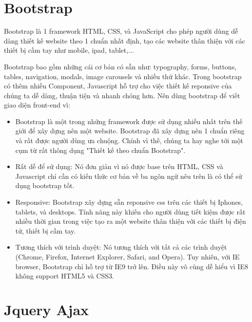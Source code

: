 \section{Bootstrap}
Bootstrap là 1 framework HTML, CSS, và JavaScript cho phép người dùng dễ dàng thiết kế website theo 1 chuẩn nhất định, tạo các website thân thiện với các thiết bị cầm tay như mobile, ipad, tablet,...
\par
Bootstrap bao gồm những cái cơ bản có sẵn như: typography, forms, buttons, tables, navigation, modals, image carousels và nhiều thứ khác. Trong bootstrap có thêm nhiều Component, Javascript hỗ trợ cho việc thiết kế reponsive của chúng ta dễ dàng, thuận tiện và nhanh chóng hơn. Nên dùng bootstrap để viết giao diện front-end vì:
\begin{itemize}
\item Bootstrap là một trong những framework được sử dụng nhiều nhất trên thế giới để xây dựng nên một website. Bootstrap đã xây dựng nên 1 chuẩn riêng và rất được người dùng ưa chuộng. Chính vì thế, chúng ta hay nghe tới một cụm từ rất thông dụng "Thiết kế theo chuẩn Bootstrap".
\item Rất dễ để sử dụng: Nó đơn giản vì nó được base trên HTML, CSS và Javascript chỉ cần có kiến thức cơ bản về ba ngôn ngữ nêu trên là có thể sử dụng bootstrap tốt.
\item Responsive: Bootstrap xây dựng sẵn reponsive css trên các thiết bị Iphones, tablets, và desktops. Tính năng này khiến cho người dùng tiết kiệm được rất nhiều thời gian trong việc tạo ra một website thân thiện với các thiết bị điện tử, thiết bị cầm tay.
\item Tương thích với trình duyệt: Nó tương thích với tất cả các trình duyệt (Chrome, Firefox, Internet Explorer, Safari, and Opera). Tuy nhiên, với IE browser, Bootstrap chỉ hỗ trợ từ IE9 trở lên. Điều này vô cùng dễ hiểu vì IE8 không support HTML5 và CSS3.
\end{itemize}

\section{Jquery Ajax}
